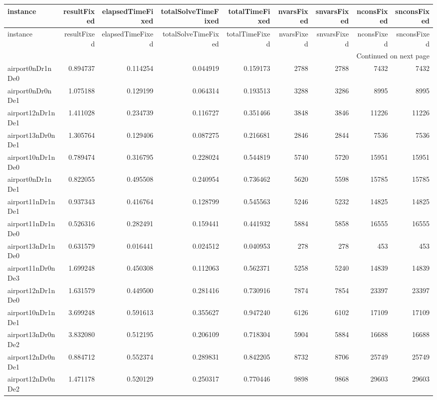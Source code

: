 \begin{longtable}{|l|r|r|r|r|r|r|r|r|}
\toprule
instance & resultFixed & elapsedTimeFixed & totalSolveTimeFixed & totalTimeFixed & nvarsFixed & snvarsFixed & nconsFixed & snconsFixed \\
\midrule
\endfirsthead
\toprule
instance & resultFixed & elapsedTimeFixed & totalSolveTimeFixed & totalTimeFixed & nvarsFixed & snvarsFixed & nconsFixed & snconsFixed \\
\midrule
\endhead
\midrule
\multicolumn{9}{r}{Continued on next page} \\
\midrule
\endfoot
\bottomrule
\endlastfoot
airport0nDr1nDe0 & 0.894737 & 0.114254 & 0.044919 & 0.159173 & 2788 & 2788 & 7432 & 7432 \\
airport0nDr0nDe1 & 1.075188 & 0.129199 & 0.064314 & 0.193513 & 3288 & 3286 & 8995 & 8995 \\
airport12nDr1nDe1 & 1.411028 & 0.234739 & 0.116727 & 0.351466 & 3848 & 3846 & 11226 & 11226 \\
airport13nDr0nDe1 & 1.305764 & 0.129406 & 0.087275 & 0.216681 & 2846 & 2844 & 7536 & 7536 \\
airport10nDr1nDe0 & 0.789474 & 0.316795 & 0.228024 & 0.544819 & 5740 & 5720 & 15951 & 15951 \\
airport0nDr1nDe1 & 0.822055 & 0.495508 & 0.240954 & 0.736462 & 5620 & 5598 & 15785 & 15785 \\
airport11nDr1nDe1 & 0.937343 & 0.416764 & 0.128799 & 0.545563 & 5246 & 5232 & 14825 & 14825 \\
airport11nDr1nDe0 & 0.526316 & 0.282491 & 0.159441 & 0.441932 & 5884 & 5858 & 16555 & 16555 \\
airport13nDr1nDe0 & 0.631579 & 0.016441 & 0.024512 & 0.040953 & 278 & 278 & 453 & 453 \\
airport11nDr0nDe3 & 1.699248 & 0.450308 & 0.112063 & 0.562371 & 5258 & 5240 & 14839 & 14839 \\
airport12nDr1nDe0 & 1.631579 & 0.449500 & 0.281416 & 0.730916 & 7874 & 7854 & 23397 & 23397 \\
airport10nDr1nDe1 & 3.699248 & 0.591613 & 0.355627 & 0.947240 & 6126 & 6102 & 17109 & 17109 \\
airport13nDr0nDe2 & 3.832080 & 0.512195 & 0.206109 & 0.718304 & 5904 & 5884 & 16688 & 16688 \\
airport12nDr0nDe1 & 0.884712 & 0.552374 & 0.289831 & 0.842205 & 8732 & 8706 & 25749 & 25749 \\
airport12nDr0nDe2 & 1.471178 & 0.520129 & 0.250317 & 0.770446 & 9898 & 9868 & 29603 & 29603 \\

\end{longtable}
